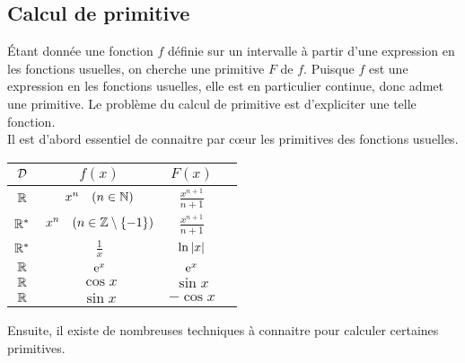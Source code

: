 \documentclass{magnoliaold}
\begin{document}
\subsection{Calcul de primitive}

Étant donnée une fonction $f$ définie sur un intervalle à partir d'une
expression en les fonctions usuelles, on cherche une primitive $F$ de $f$.
Puisque $f$ est une expression en les fonctions usuelles, elle est en
particulier continue, donc admet une primitive. Le problème du calcul de
primitive est d'expliciter une telle fonction.\\

Il est d'abord essentiel de connaitre par cœur les primitives des fonctions usuelles.

\begin{center}
\begin{tabular}{|c|c|c|c|}
\hline
$\mathcal{D}$ & $f(x)$ & $F(x)$\\
\hline
$\mathbb{R}$ & $x^n \quad (n\in\mathbb{N})$ & $\frac{x^{n+1}}{n+1}$\\
\hline
${\mathbb{R}^*}$ & $x^n \quad (n\in\mathbb{Z}\setminus\left\{-1\right\})$ & $\frac{x^{n+1}}{n+1}$\\
\hline
${\mathbb{R}^*}$ & $\frac{1}{x}$ & $\ln\left|x\right|$\\
\hline
\hline
$\mathbb{R}$ & ${\rm e}^x$ & ${\rm e}^x$\\
\hline
$\mathbb{R}$ & $\cos x$ & $\sin x$\\
\hline
$\mathbb{R}$ & $\sin x$ & $-\cos x$\\
\hline
\end{tabular}
\end{center}

Ensuite, il existe de nombreuses techniques à connaitre pour calculer certaines primitives.
\end{document}
